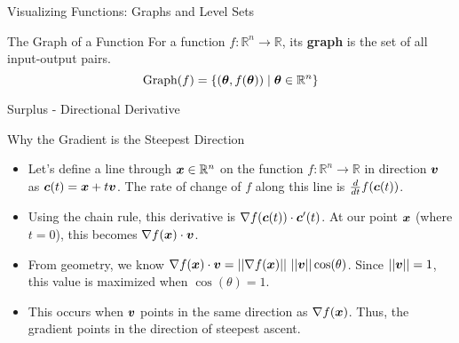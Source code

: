 \documentclass{beamer}
\begin{document}
\begin{frame}{Visualizing Functions: Graphs and Level Sets}
\footnotesize
\begin{definitionbox}{The Graph of a Function}
For a function $f: \mathbb{R}^n \to \mathbb{R}$, its \textbf{graph} is the set of all input-output pairs.
$$ \text{Graph}(f) = \{ (\bm{\theta}, f(\bm{\theta})) \mid \bm{\theta} \in \mathbb{R}^n \} $$
\end{definitionbox}

\end{frame}

\begin{frame}{Surplus - Directional Derivative}
\begin{alertbox}{Why the Gradient is the Steepest Direction}
\begin{itemize}[<*>]
    \item Let's define a line through $\bm{x} \in \mathbb{R}^n$ on the function $f:\mathbb{R}^n \to \mathbb{R}$ in direction $\bm{v}$ as $\bm{c}(t) = \bm{x} + t\bm{v}$. The rate of change of $f$ along this line is $\frac{d}{dt}f(\bm{c}(t))$.
    
    \item Using the chain rule, this derivative is $\nabla f(\bm{c}(t)) \cdot \bm{c}'(t)$. At our point $\bm{x}$ (where $t=0$), this becomes $\nabla f(\bm{x}) \cdot \bm{v}$.
        
    \item From geometry, we know $\grad f(\vecMat{x}) \cdot \vecMat{v} = ||\grad f(\vecMat{x})|| \ ||\vecMat{v}|| \cos(\theta)$. Since $||\bm{v}||=1$, this value is maximized when $\cos(\theta)=1$.
        
    \item This occurs when $\bm{v}$ points in the same direction as $\nabla f(\bm{x})$. Thus, the gradient points in the direction of steepest ascent.
\end{itemize}
\end{alertbox}
\end{frame}
\end{document}
